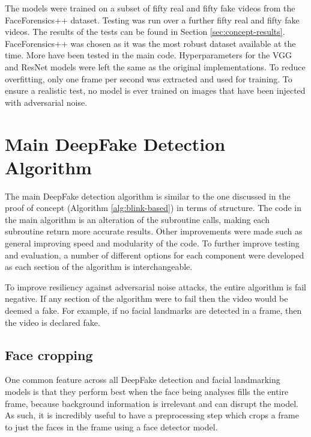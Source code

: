 The models were trained on a subset of fifty real and fifty fake videos from the FaceForensics++ dataset\cite{roessler2018faceforensics}. Testing was run over a further fifty real and fifty fake videos. The results of the tests can be found in Section \ref{sec:concept-results}. FaceForensics++ was chosen as it was the most robust dataset available at the time. More have been tested in the main code. Hyperparameters for the VGG and ResNet models were left the same as the original implementations. To reduce overfitting, only one frame per second was extracted and used for training. To ensure a realistic test, no model is ever trained on images that have been injected with adversarial noise.

\section{Main DeepFake Detection Algorithm}


The main DeepFake detection algorithm is similar to the one discussed in the proof of concept (Algorithm \ref{alg:blink-based}) in terms of structure. The code in the main algorithm is an alteration of the subroutine calls, making each subroutine return more accurate results. Other improvements were made such as general improving speed and modularity of the code. To further improve testing and evaluation, a number of different options for each component were developed as each section of the algorithm is interchangeable. 

To improve resiliency against adversarial noise attacks, the entire algorithm is fail negative. If any section of the algorithm were to fail then the video would be deemed a fake. For example, if no facial landmarks are detected in a frame, then the video is declared fake.

\subsection{Face cropping}
\label{sec:face-cropping}

One common feature across all DeepFake detection and facial landmarking models is that they perform best when the face being analyses fills the entire frame, because background information is irrelevant and can disrupt the model. As such, it is incredibly useful to have a preprocessing step which crops a frame to just the faces in the frame using a face detector model. 

